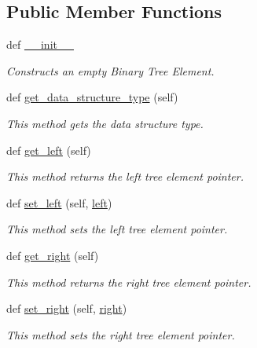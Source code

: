 \subsection*{Public Member Functions}
\begin{DoxyCompactItemize}
\item 
def \hyperlink{class_bridges_1_1bin__tree__element_1_1_bin_tree_element_a55f0728b5c2d4ab4788c7af6a43d3799}{\+\_\+\+\_\+init\+\_\+\+\_\+}
\begin{DoxyCompactList}\small\item\em Constructs an empty Binary Tree Element. \end{DoxyCompactList}\item 
def \hyperlink{class_bridges_1_1bin__tree__element_1_1_bin_tree_element_af3618c59a2a576cb47b2f16433fcbac3}{get\+\_\+data\+\_\+structure\+\_\+type} (self)
\begin{DoxyCompactList}\small\item\em This method gets the data structure type. \end{DoxyCompactList}\item 
def \hyperlink{class_bridges_1_1bin__tree__element_1_1_bin_tree_element_a30ee0afc88fdbf55f7b645981dda73f2}{get\+\_\+left} (self)
\begin{DoxyCompactList}\small\item\em This method returns the left tree element pointer. \end{DoxyCompactList}\item 
def \hyperlink{class_bridges_1_1bin__tree__element_1_1_bin_tree_element_a4a86199c8090bcd7e603bccea2b5edff}{set\+\_\+left} (self, \hyperlink{class_bridges_1_1bin__tree__element_1_1_bin_tree_element_ae71553e3888615cdeb6fd8487045653c}{left})
\begin{DoxyCompactList}\small\item\em This method sets the left tree element pointer. \end{DoxyCompactList}\item 
def \hyperlink{class_bridges_1_1bin__tree__element_1_1_bin_tree_element_ae9e74ea73a3f5c27459344f1db42d9b6}{get\+\_\+right} (self)
\begin{DoxyCompactList}\small\item\em This method returns the right tree element pointer. \end{DoxyCompactList}\item 
def \hyperlink{class_bridges_1_1bin__tree__element_1_1_bin_tree_element_a171c46c251828f265ea8fb60b396f5b7}{set\+\_\+right} (self, \hyperlink{class_bridges_1_1bin__tree__element_1_1_bin_tree_element_acae42ce2d77e073ea539893c86103c17}{right})
\begin{DoxyCompactList}\small\item\em This method sets the right tree element pointer. \end{DoxyCompactList}\end{DoxyCompactItemize}
